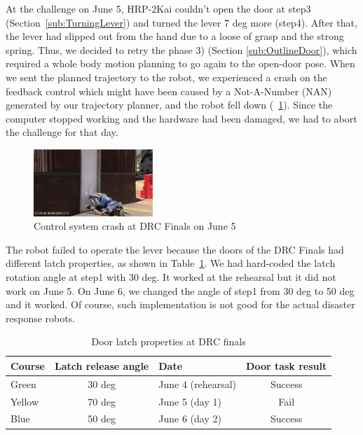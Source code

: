 At the challenge on June 5, HRP-2Kai couldn't open the door at step3 (Section~\ref{sub:TurningLever})
and turned the lever 7 deg more (step4).
After that, the lever had slipped out from the hand due to a loose of grasp and the strong spring.
Thus, we decided to retry the phase 3) (Section \ref{sub:OutlineDoor}), which required a whole body
motion planning to go again to the open-door pose.
When we sent the planned trajectory to the robot, we experienced a crash on the feedback control
which might have been caused by a Not-A-Number (NAN) generated by our trajectory planner, and the
robot fell down (\figurename~\ref{fig:drc_door_aist_day1}).
Since the computer stopped working and the hardware had been damaged, we had to abort the
challenge for that day. 
%
\begin{figure}[t]
  \centering
  \includegraphics[width = 4.5cm]{img/drc_door_aist_day1}
  \caption{Control system crash at DRC Finals on June 5~\cite{DARPA}}
  \label{fig:drc_door_aist_day1}
\end{figure}

The robot failed to operate the lever because the doors of the DRC Finals had different
latch properties, as shown in Table~\ref{tbl:door_latch}.
We had hard-coded the latch rotation angle at step1 with 30 deg.
It worked at the rehearsal but it did not work on June 5.
On June 6, we changed the angle of step1 from 30 deg to 50 deg and it worked.
Of course, such implementation is not good for the actual disaster response robots.
%
\begin{table}[b]
\caption{Door latch properties at DRC finals} \label{tbl:door_latch}
\begin{tabular}{lclc}
\hline
Course & Latch release angle & Date & Door task result  \\ 
\hline
Green & 30 deg & June 4 (rehearsal) & Success  \\
Yellow & 70 deg & June 5 (day 1) & Fail \\
Blue &  50 deg & June 6 (day 2)  & Success \\
\hline
\end{tabular}
\end{table}

